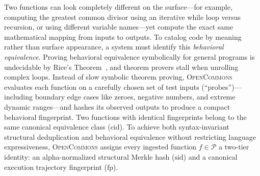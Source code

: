 \documentclass[10pt,twocolumn]{article}
\begin{document}
Two functions can look completely different on the surface---for example, computing the greatest common divisor using an iterative while loop versus recursion, or using different variable names---yet compute the exact same mathematical mapping from inputs to outputs. To catalog code by meaning rather than surface appearance, a system must identify this \emph{behavioral equivalence}. Proving behavioral equivalence symbolically for general programs is undecidable by Rice's Theorem~\cite{rice1953classes}, and theorem provers stall when unrolling complex loops. Instead of slow symbolic theorem proving, \textsc{OpenCommons} evaluates each function on a carefully chosen set of test inputs (``probes'')---including boundary edge cases like zeroes, negative numbers, and extreme dynamic ranges---and hashes its observed outputs to produce a compact behavioral fingerprint. Two functions with identical fingerprints belong to the same canonical equivalence class ($\text{cid}$). To achieve both syntax-invariant structural deduplication and behavioral equivalence without restricting language expressiveness, \textsc{OpenCommons} assigns every ingested function $f \in \mathcal{P}$ a two-tier identity: an alpha-normalized structural Merkle hash ($\text{sid}$) and a canonical execution trajectory fingerprint ($\text{fp}$).
\end{document}
